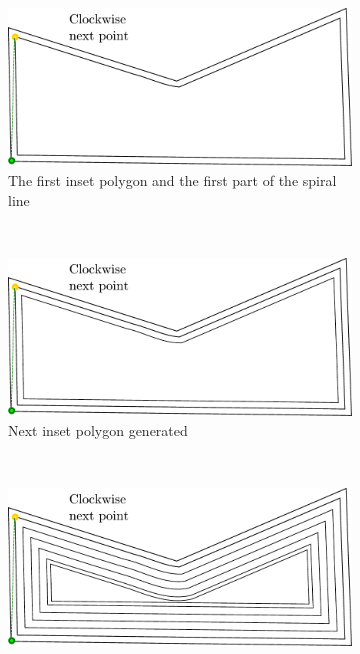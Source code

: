 \documentclass[10pt,twoside,a4paper]{report}
\begin{document}
\begin{figure}[htbp]
	\centering
    \begin{subfigure}[b]{0.45\textwidth}
    		\includegraphics[width=\textwidth]{images/algorithms/spiral_fill/2.pdf}
		\caption{The first inset polygon and the first part of the spiral line}
    \end{subfigure}
    ~
    \begin{subfigure}[b]{0.45\textwidth}
    		\includegraphics[width=\textwidth]{images/algorithms/spiral_fill/3.pdf}
    		\caption{Next inset polygon generated}
    \end{subfigure}\\
    \begin{subfigure}[b]{0.45\textwidth}
    		\includegraphics[width=\textwidth]{images/algorithms/spiral_fill/4.pdf}

\end{subfigure}
\end{figure}
\end{document}
